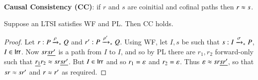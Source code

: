 \begin{definition}\label{def:cc}
  {\bf Causal Consistency (CC)}: if $r$ and $s$ are coinitial and cofinal paths then $r \approx s$.
\end{definition}


\begin{proposition}\label{prop:PL WF CC}
  Suppose an LTSI satisfies WF and PL. 
  Then CC holds.
\end{proposition}
\begin{proof}
  Let $r:P \xrightarrow[]{\rho}_{*} Q$ and $r':P \xrightarrow[]{\rho'}_{*} Q$.
  Using WF, let $I,s$ be such that $s:I \xrightarrow[]{\sigma}_{*} P$, $I \in \mathsf{Irr}$.
  Now $sr\underline{sr'}$ is a path from $I$ to $I$,
  and so by PL there are $r_1,r_2$ forward-only 
  such that $\underline{r_1}r_2 \approx sr\underline{sr'}$.
  But $I \in \mathsf{Irr}$ and so $r_1 = \varepsilon$ and $r_2 = \varepsilon$.
  Thus $\varepsilon \approx sr\underline{sr'}$, so that $sr \approx sr'$ and $r \approx r'$
  as required.
\end{proof}
